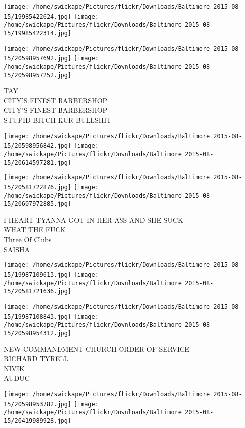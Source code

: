 \documentclass[10pt,letterpaper]{article}
\begin{document}
\texttt{[image: /home/swickape/Pictures/flickr/Downloads/Baltimore 2015-08-15/19985422624.jpg]}
\texttt{[image: /home/swickape/Pictures/flickr/Downloads/Baltimore 2015-08-15/19985422314.jpg]}

\texttt{[image: /home/swickape/Pictures/flickr/Downloads/Baltimore 2015-08-15/20598957692.jpg]}
\texttt{[image: /home/swickape/Pictures/flickr/Downloads/Baltimore 2015-08-15/20598957252.jpg]}

TAY\\
CITY'S FINEST BARBERSHOP\\
CITY'S FINEST BARBERSHOP\\
STUPID BITCH KUR BULLSHIT\\
\pagebreak

\texttt{[image: /home/swickape/Pictures/flickr/Downloads/Baltimore 2015-08-15/20598956842.jpg]}
\texttt{[image: /home/swickape/Pictures/flickr/Downloads/Baltimore 2015-08-15/20614597281.jpg]}

\texttt{[image: /home/swickape/Pictures/flickr/Downloads/Baltimore 2015-08-15/20581722876.jpg]}
\texttt{[image: /home/swickape/Pictures/flickr/Downloads/Baltimore 2015-08-15/20607972885.jpg]}

I HEART TYANNA GOT IN HER ASS AND SHE SUCK\\
WHAT THE FUCK\\
Three Of Clubs\\
SAISHA\\
\pagebreak

\texttt{[image: /home/swickape/Pictures/flickr/Downloads/Baltimore 2015-08-15/19987109613.jpg]}
\texttt{[image: /home/swickape/Pictures/flickr/Downloads/Baltimore 2015-08-15/20581721636.jpg]}

\texttt{[image: /home/swickape/Pictures/flickr/Downloads/Baltimore 2015-08-15/19987108843.jpg]}
\texttt{[image: /home/swickape/Pictures/flickr/Downloads/Baltimore 2015-08-15/20598954312.jpg]}

NEW COMMANDMENT CHURCH ORDER OF SERVICE\\
RICHARD TYRELL\\
NIVIK\\
AUDUC\\
\pagebreak

\texttt{[image: /home/swickape/Pictures/flickr/Downloads/Baltimore 2015-08-15/20598953782.jpg]}
\texttt{[image: /home/swickape/Pictures/flickr/Downloads/Baltimore 2015-08-15/20419989928.jpg]}
\end{document}

